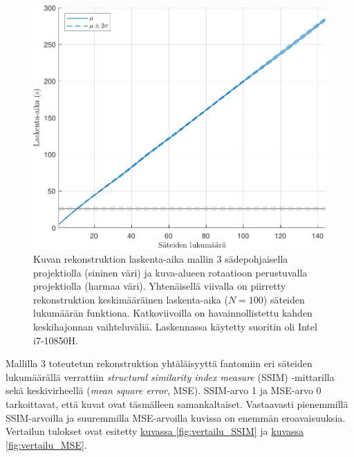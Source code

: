 \begin{figure}[H]
    \centering
    \captionsetup{width=.9\linewidth}
    \includegraphics[width=.9\linewidth]{kuvat/laskenta_aika.pdf}
    \caption{Kuvan rekonstruktion laskenta-aika mallin 3 sädepohjaisella projektiolla (sininen väri) ja kuva-alueen rotaatioon perustuvalla projektiolla (harmaa väri). Yhtenäisellä viivalla on piirretty rekonstruktion keskimääräinen laskenta-aika ($N=100$) säteiden lukumäärän funktiona. Katkoviivoilla on havainnollistettu kahden keskihajonnan vaihteluväliä. Laskennassa käytetty suoritin oli Intel i7-10850H.}
    \label{fig:laskenta_aika}
\end{figure}

Mallilla 3 toteutetun rekonstruktion yhtäläisyyttä fantomiin eri säteiden lukumäärällä verrattiin \textit{structural similarity index measure} (SSIM) -mittarilla\cite{wang_image_2004} sekä keskivirheellä (\textit{mean square error}, MSE). SSIM-arvo 1 ja MSE-arvo 0 tarkoittavat, että kuvat ovat täsmälleen samankaltaiset. Vastaavasti pienemmillä SSIM-arvoilla ja suuremmilla MSE-arvoilla kuvissa on enemmän eroavaisuuksia. Vertailun tulokset ovat esitetty \hyperref[fig:vertailu_SSIM]{kuvassa \ref*{fig:vertailu_SSIM}} ja \hyperref[fig:vertailu_MSE]{kuvassa \ref*{fig:vertailu_MSE}}.

